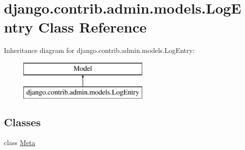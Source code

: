 \hypertarget{classdjango_1_1contrib_1_1admin_1_1models_1_1_log_entry}{}\section{django.\+contrib.\+admin.\+models.\+Log\+Entry Class Reference}
\label{classdjango_1_1contrib_1_1admin_1_1models_1_1_log_entry}
Inheritance diagram for django.\+contrib.\+admin.\+models.\+Log\+Entry\+:\begin{figure}[H]
\begin{center}
\leavevmode
\includegraphics[height=2.000000cm]{classdjango_1_1contrib_1_1admin_1_1models_1_1_log_entry}
\end{center}
\end{figure}
\subsection*{Classes}
\begin{DoxyCompactItemize}
\item 
class \mbox{\hyperlink{classdjango_1_1contrib_1_1admin_1_1models_1_1_log_entry_1_1_meta}{Meta}}
\end{DoxyCompactItemize}
